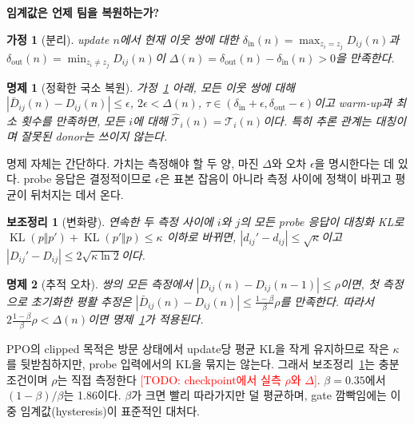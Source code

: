 \documentclass[twocolumn,10pt]{article}
\newtheorem{proposition}{명제}
\newtheorem{lemma}{보조정리}
\newtheorem{assumption}{가정}
\theoremstyle{remark}
\newcommand{\todo}[1]{\textcolor{red}{[TODO: #1]}}
\newcommand{\KL}{\operatorname{KL}}
\begin{document}
\textbf{임계값은 언제 팀을 복원하는가?}
\begin{assumption}[분리]
\label{as:separation}
update $n$에서 현재 이웃 쌍에 대한 $\delta_{\mathrm{in}}(n)=\max_{z_i=z_j}D_{ij}(n)$과 $\delta_{\mathrm{out}}(n)=\min_{z_i\ne z_j}D_{ij}(n)$이
$\Delta(n)=\delta_{\mathrm{out}}(n)-\delta_{\mathrm{in}}(n)>0$을 만족한다.
\end{assumption}
\begin{proposition}[정확한 국소 복원]
\label{prop:recovery}
가정~\ref{as:separation} 아래, 모든 이웃 쌍에 대해 $|\bar D_{ij}(n)-D_{ij}(n)|\le\epsilon$, $2\epsilon<\Delta(n)$,
$\tau\in(\delta_{\mathrm{in}}+\epsilon,\delta_{\mathrm{out}}-\epsilon)$이고 warm-up과 최소 횟수를 만족하면, 모든 $i$에 대해 $\hat{\mathcal{T}}_i(n)=\mathcal{T}_i(n)$이다. 특히
추론 관계는 대칭이며 잘못된 donor는 쓰이지 않는다.
\end{proposition}
명제 자체는 간단하다. 가치는 측정해야 할 두 양, 마진 $\Delta$와 오차 $\epsilon$을 명시한다는 데 있다. probe 응답은 결정적이므로 $\epsilon$은 표본 잡음이 아니라 측정 사이에
정책이 바뀌고 평균이 뒤처지는 데서 온다.
\begin{lemma}[변화량]
\label{lem:drift}
연속한 두 측정 사이에 $i$와 $j$의 모든 probe 응답이 대칭화 KL로 $\KL(p\Vert p')+\KL(p'\Vert p)\le\kappa$ 이하로 바뀌면, $|d_{ij}'-d_{ij}|\le\sqrt{\kappa}$이고
$|D_{ij}'-D_{ij}|\le2\sqrt{\kappa\ln 2}$이다.
\end{lemma}
\begin{proposition}[추적 오차]
\label{prop:tracking}
쌍의 모든 측정에서 $|D_{ij}(n)-D_{ij}(n-1)|\le\rho$이면, 첫 측정으로 초기화한 평활 추정은 $|\bar D_{ij}(n)-D_{ij}(n)|\le\frac{1-\beta}{\beta}\rho$를 만족한다. 따라서
$2\frac{1-\beta}{\beta}\rho<\Delta(n)$이면 명제~\ref{prop:recovery}가 적용된다.
\end{proposition}
PPO의 clipped 목적은 방문 상태에서 update당 평균 KL을 작게 유지하므로 작은 $\kappa$를 뒷받침하지만, probe 입력에서의 KL을 묶지는 않는다. 그래서 보조정리~\ref{lem:drift}는
충분조건이며 $\rho$는 직접 측정한다 \todo{checkpoint에서 실측 $\rho$와 $\Delta$}. $\beta=0.35$에서 $(1-\beta)/\beta$는 1.86이다. $\beta$가 크면 빨리 따라가지만 덜 평균하며,
gate 깜빡임에는 이중 임계값(hysteresis)이 표준적인 대처다.
\end{document}
